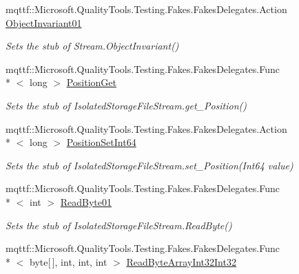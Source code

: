 \begin{DoxyCompactItemize}
mqttf\-::\-Microsoft.\-Quality\-Tools.\-Testing.\-Fakes.\-Fakes\-Delegates.\-Action \hyperlink{class_system_1_1_i_o_1_1_isolated_storage_1_1_fakes_1_1_stub_isolated_storage_file_stream_a17f6214bffaaad95d2309e2191e38961}{Object\-Invariant01}
\begin{DoxyCompactList}\small\item\em Sets the stub of Stream.\-Object\-Invariant()\end{DoxyCompactList}\item 
mqttf\-::\-Microsoft.\-Quality\-Tools.\-Testing.\-Fakes.\-Fakes\-Delegates.\-Func\\*
$<$ long $>$ \hyperlink{class_system_1_1_i_o_1_1_isolated_storage_1_1_fakes_1_1_stub_isolated_storage_file_stream_abe9aede52ed8156f7c720752ae6ef462}{Position\-Get}
\begin{DoxyCompactList}\small\item\em Sets the stub of Isolated\-Storage\-File\-Stream.\-get\-\_\-\-Position()\end{DoxyCompactList}\item 
mqttf\-::\-Microsoft.\-Quality\-Tools.\-Testing.\-Fakes.\-Fakes\-Delegates.\-Action\\*
$<$ long $>$ \hyperlink{class_system_1_1_i_o_1_1_isolated_storage_1_1_fakes_1_1_stub_isolated_storage_file_stream_a1065fba15d662998089ccf41adcb74fb}{Position\-Set\-Int64}
\begin{DoxyCompactList}\small\item\em Sets the stub of Isolated\-Storage\-File\-Stream.\-set\-\_\-\-Position(\-Int64 value)\end{DoxyCompactList}\item 
mqttf\-::\-Microsoft.\-Quality\-Tools.\-Testing.\-Fakes.\-Fakes\-Delegates.\-Func\\*
$<$ int $>$ \hyperlink{class_system_1_1_i_o_1_1_isolated_storage_1_1_fakes_1_1_stub_isolated_storage_file_stream_a691c227e7a8fb3c85f7552fce7de2e99}{Read\-Byte01}
\begin{DoxyCompactList}\small\item\em Sets the stub of Isolated\-Storage\-File\-Stream.\-Read\-Byte()\end{DoxyCompactList}\item 
mqttf\-::\-Microsoft.\-Quality\-Tools.\-Testing.\-Fakes.\-Fakes\-Delegates.\-Func\\*
$<$ byte\mbox{[}$\,$\mbox{]}, int, int, int $>$ \hyperlink{class_system_1_1_i_o_1_1_isolated_storage_1_1_fakes_1_1_stub_isolated_storage_file_stream_a4f8fa98e957c2cd06d8fa10b0e625a74}{Read\-Byte\-Array\-Int32\-Int32}

\end{DoxyCompactItemize}
